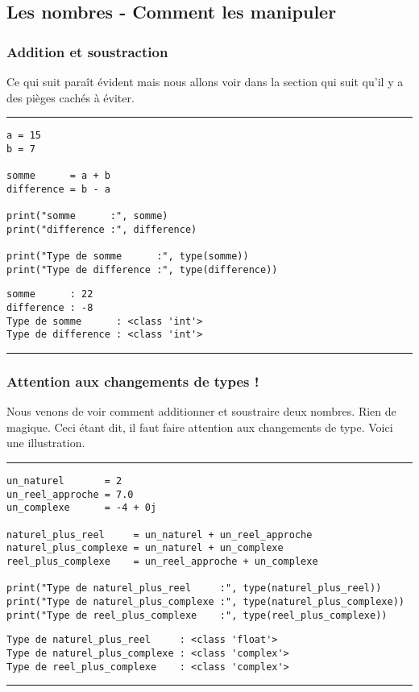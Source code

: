 \subsection{Les nombres - Comment les manipuler}

\subsubsection{Addition et soustraction}

Ce qui suit paraît évident mais nous allons voir dans la section qui suit qu'il y a des pièges cachés à éviter.

\newpage

\bigskip
{\hrule height .5mm}
\begin{verbatim}
a = 15
b = 7

somme      = a + b
difference = b - a

print("somme      :", somme)
print("difference :", difference)

print("Type de somme      :", type(somme))
print("Type de difference :", type(difference))
\end{verbatim}
 \color{ForestGreen}
\vspace{-1.5em}
\begin{verbatim}
somme      : 22
difference : -8
Type de somme      : <class 'int'>
Type de difference : <class 'int'>
\end{verbatim} \color{Black}
{\hrule height .5mm}
\bigskip


\subsubsection{Attention aux changements de types !}

Nous venons de voir comment additionner et soustraire deux nombres. Rien de magique. Ceci étant dit, il faut faire attention aux changements de type. Voici une illustration.


\bigskip
{\hrule height .5mm}
\begin{verbatim}
un_naturel       = 2
un_reel_approche = 7.0
un_complexe      = -4 + 0j

naturel_plus_reel     = un_naturel + un_reel_approche
naturel_plus_complexe = un_naturel + un_complexe
reel_plus_complexe    = un_reel_approche + un_complexe

print("Type de naturel_plus_reel     :", type(naturel_plus_reel))
print("Type de naturel_plus_complexe :", type(naturel_plus_complexe))
print("Type de reel_plus_complexe    :", type(reel_plus_complexe))
\end{verbatim}
 \color{ForestGreen}
\vspace{-1.5em}
\begin{verbatim}
Type de naturel_plus_reel     : <class 'float'>
Type de naturel_plus_complexe : <class 'complex'>
Type de reel_plus_complexe    : <class 'complex'>
\end{verbatim} \color{Black}
{\hrule height .5mm}
\bigskip



